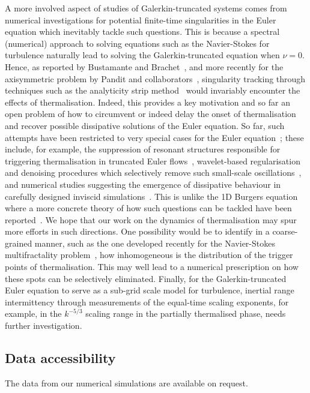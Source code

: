 \documentclass[../Rajarshi-thesis-draft.tex]{subfiles}
\begin{document}
A more involved aspect of studies of Galerkin-truncated systems comes from numerical
investigations for potential finite-time singularities in the Euler equation
which inevitably tackle such questions. This is because a spectral (numerical) approach to solving equations such as the Navier-Stokes for turbulence naturally lead to solving the Galerkin-truncated equation when $\nu = 0$.
Hence, as reported by Bustamante and Brachet~\cite{BustamanteBrachet2012}, and
more recently for the axisymmetric problem by Pandit and collaborators~\cite{Kolluruetal2022,KolluruPandit2024,KolluruetalJCP2024},
singularity tracking through techniques such as the analyticity strip
method~\cite{Sulemetal1983} would invariably encounter the effects of
thermalisation. {Indeed, this provides a key motivation and so
far an open problem of how to circumvent or indeed delay the onset of
thermalisation and recover possible dissipative solutions of the Euler
equation. So far, such attempts have been restricted to very special cases for
the Euler equation~\cite{MuruganRay2023,Fehnetal2022,Fargeetal2017}; these
include, for example, the suppression of resonant structures responsible for
triggering thermalisation in truncated Euler flows~\cite{MuruganRay2023},
wavelet-based regularisation and denoising procedures which selectively remove
such small-scale oscillations~\cite{Nguyen2009,Fargeetal2017,Pereira2022,PereiraSIAM2023}, and numerical studies
suggesting the emergence of dissipative behaviour in carefully designed
inviscid simulations~\cite{Fehnetal2022}.} This is unlike the 1D Burgers
equation where a more concrete theory of how such questions can be tackled have
been reported~\cite{Muruganetal2020,Kolluruetal2024}. We hope that our work on
the dynamics of thermalisation may spur more efforts in such directions. One
possibility would be to identify in a coarse-grained manner, such as the one
developed recently for the Navier-Stokes multifractality
problem~\cite{Mukherjeeetal2024}, how inhomogeneous is the distribution of the
trigger points of thermalisation. This may well lead to a numerical
prescription on how these spots can be selectively eliminated.  Finally, for
the Galerkin-truncated Euler equation to serve as a sub-grid scale model for
turbulence, inertial range intermittency through measurements of the equal-time
scaling exponents, for example, in the $k^{-5/3}$ scaling range in the
partially thermalised phase, needs further investigation.

\enlargethispage{20pt}

\subsection*{Data accessibility}
The data from our numerical simulations are available on request.
\end{document}
